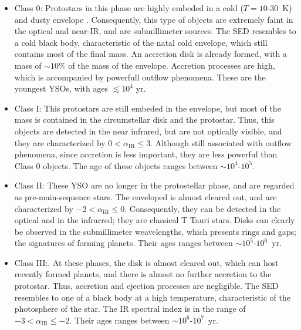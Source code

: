 \documentclass[12pt]{mythesis}
\begin{document}
\begin{itemize}
	\item Class 0:  Protostars in this phase are highly embeded in a cold ($T=10$-$30$~K) and dusty envelope \citep{andre2000}. Consequently, this type of objects are extremely faint in the optical and near-IR, and are submillimeter sources. The SED resembles to a cold black body, characteristic of the natal cold envelope, which still contains most of the final mass. An accretion disk is already formed, with a mass of $\sim10\%$ of the mass of the envelope. Accretion processes are high, which is accompanied by powerfull outflow phenomena. These are the youngest YSOs, with ages $\lesssim 10^4$ yr.
	\item Class I: This protostars are still embeded in the envelope, but most of the mass is contained in the circumstellar disk and the protostar. Thus, this objects are detected in the near infrared, but are not optically visible, and they are characterized by $0<\alpha_\mathrm{IR}\le 3$. Although still associated with outflow phenomena, since accretion is less important, they are less powerful than Class 0 objects. The age of these objects ranges between $\sim 10^4$-$10^5$.
	\item Class II: These YSO are no longer in the protostellar phase, and are regarded as pre-main-sequence stars. The enveloped is almost cleared out, and are characterized by $-2<\alpha_\mathrm{IR}\le 0$. Consequently, they can be detected in the optical and in the infrarred; they are classical T Tauri stars. Disks can clearly be observed in the submillimeter weavelengths, which presents rings and gaps; the signatures of forming planets. Their ages ranges between $\sim10^5$-$10^6$~yr.
	\item Class III:. At these phases, the disk is almost cleared out, which can host recently formed planets, and there is almost no further accretion to the protostar. Thus, accretion and ejection processes are negligible. The SED resembles to one of a black body at a high temperature, characteristic of the photosphere of the star. The IR spectral index is in the range of $-3<\alpha_\mathrm{IR}\le -2$. Their ages ranges between $\sim10^6$-$10^7$~yr.
\end{itemize}

\end{document}
